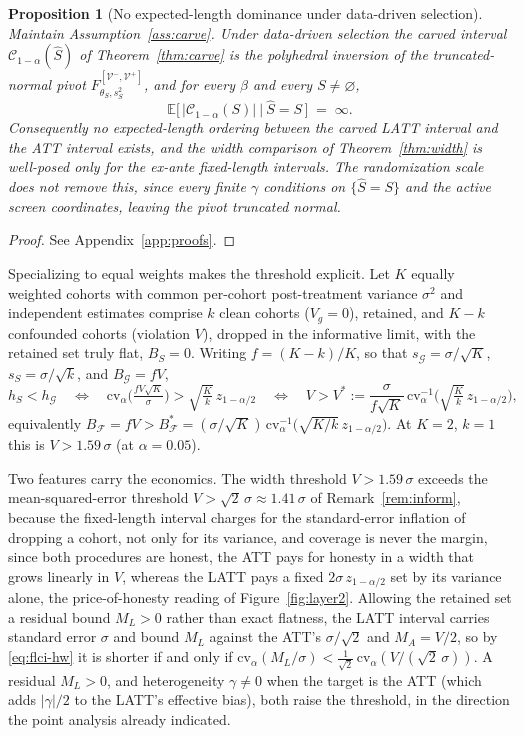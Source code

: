 \documentclass[12pt]{article}
\newtheorem{proposition}{Proposition}
\theoremstyle{remark}
\begin{document}
\begin{proposition}[No expected-length dominance under data-driven selection]\label{prop:nolength}
Maintain Assumption~\ref{ass:carve}. Under data-driven selection the carved interval
$\mathcal C_{1-\alpha}(\hat S)$ of Theorem~\ref{thm:carve} is the polyhedral inversion of the
truncated-normal pivot $F_{\theta_S,s_S^2}^{[\mathcal V^-,\mathcal V^+]}$, and for every $\beta$ and every
$S\neq\varnothing$,
\[
\mathbb E\big[\,\lvert\mathcal C_{1-\alpha}(S)\rvert\ \big|\ \hat S=S\,\big]\;=\;\infty.
\]
Consequently no expected-length ordering between the carved LATT interval and the ATT interval exists, and
the width comparison of Theorem~\ref{thm:width} is well-posed only for the ex-ante fixed-length intervals.
The randomization scale does not remove this, since every finite $\gamma$ conditions on $\{\hat S=S\}$ and
the active screen coordinates, leaving the pivot truncated normal.
\end{proposition}

\begin{proof}
See Appendix~\ref{app:proofs}.
\end{proof}

Specializing to equal weights makes the threshold explicit. Let $K$ equally weighted cohorts with common
per-cohort post-treatment variance $\sigma^2$ and
independent estimates comprise $k$ clean cohorts ($V_g=0$), retained, and $K-k$ confounded cohorts
(violation $V$), dropped in the informative limit, with the retained set truly flat, $B_S=0$.
Writing $f=(K-k)/K$, so that $s_{\mathcal G}=\sigma/\sqrt K$, $s_S=\sigma/\sqrt k$, and
$B_{\mathcal G}=fV$,
\[
h_S<h_{\mathcal G}\quad\Longleftrightarrow\quad
\mathrm{cv}_\alpha\!\Big(\tfrac{fV\sqrt K}{\sigma}\Big)>\sqrt{\tfrac{K}{k}}\,z_{1-\alpha/2}
\quad\Longleftrightarrow\quad
V>V^\ast:=\frac{\sigma}{f\sqrt K}\,
\mathrm{cv}_\alpha^{-1}\!\Big(\sqrt{\tfrac{K}{k}}\,z_{1-\alpha/2}\Big),
\]
equivalently $B_{\mathcal F}=fV>B_{\mathcal F}^\ast=(\sigma/\sqrt K)\,
\mathrm{cv}_\alpha^{-1}\big(\sqrt{K/k}\,z_{1-\alpha/2}\big)$. At $K=2$, $k=1$ this is $V>1.59\,\sigma$
(at $\alpha=0.05$).

Two features carry the economics. The width threshold $V>1.59\,\sigma$ exceeds the mean-squared-error
threshold $V>\sqrt2\,\sigma\approx1.41\,\sigma$ of Remark~\ref{rem:inform}, because the fixed-length
interval charges for the standard-error inflation of dropping a cohort, not only for its variance, and
coverage is never the margin, since both procedures are honest, the ATT pays for honesty in a width that
grows linearly in $V$, whereas the LATT pays a fixed $2\sigma\,z_{1-\alpha/2}$ set by its variance alone,
the price-of-honesty reading of Figure~\ref{fig:layer2}. Allowing the retained set a residual bound
$M_L>0$ rather than exact flatness, the LATT interval carries standard error $\sigma$ and bound $M_L$
against the ATT's $\sigma/\sqrt2$ and $M_A=V/2$, so by \eqref{eq:flci-hw} it is shorter if and only if
$\mathrm{cv}_\alpha(M_L/\sigma)<\tfrac1{\sqrt2}\,\mathrm{cv}_\alpha(V/(\sqrt2\,\sigma))$. A residual
$M_L>0$, and heterogeneity $\gamma\neq0$ when the target is the ATT (which adds $\lvert\gamma\rvert/2$ to
the LATT's effective bias), both raise the threshold, in the direction the point analysis already
indicated.
\end{document}
